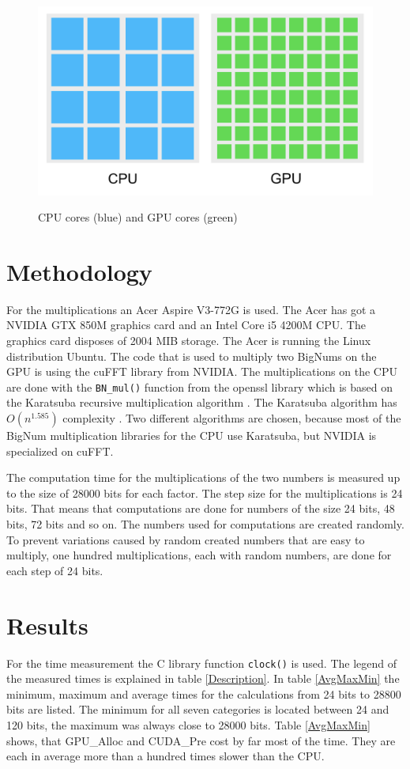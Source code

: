 \documentclass[12pt,a4paper]{article}
\begin{document}
\begin{figure}[hbt!]
\centering 
\caption{CPU cores (blue) and GPU cores (green)}
\includegraphics[scale=0.33]{cpugpu.png}
\label{cpu_gpu_cores} 
\end{figure}

\section{Methodology}
For the multiplications an Acer Aspire V3-772G is used. The Acer has got a NVIDIA GTX 850M graphics card and an Intel Core i5 4200M CPU. The graphics card disposes of 2004 MIB storage. The Acer is running the Linux distribution Ubuntu. The code that is used to multiply two BigNums on the GPU is using the cuFFT library from NVIDIA. The multiplications on the CPU are done with the \texttt{BN_mul()} function from the openssl library which is based on the Karatsuba recursive multiplication algorithm \cite{young1995bnmul}. The Karatsuba algorithm has $O(n^{1.585})$ complexity \cite{dietzfelbinger2012eff}. Two different algorithms are chosen, because most of the BigNum multiplication libraries for the CPU use Karatsuba, but NVIDIA is specialized on cuFFT.

The computation time for the multiplications of the two numbers is measured up to the size of 28000 bits for each factor. The step size for the multiplications is 24 bits. That means that computations are done for numbers of the size 24 bits, 48 bits, 72 bits and so on. The numbers used for computations are created randomly. To prevent variations caused by random created numbers that are easy to multiply, one hundred multiplications, each with random numbers, are done for each step of 24 bits.

\section{Results}
For the time measurement the C library function \texttt{clock()} is used. The legend of the measured times is explained in table \ref{Description}. In table \ref{AvgMaxMin} the minimum, maximum and average times for the calculations from 24 bits to 28800 bits are listed. The minimum for all seven categories is located between 24 and 120 bits, the maximum was always close to 28000 bits. Table \ref{AvgMaxMin} shows, that GPU\_Alloc and CUDA\_Pre cost by far most of the time. They are each in average more than a hundred times slower than the CPU.
\end{document}
